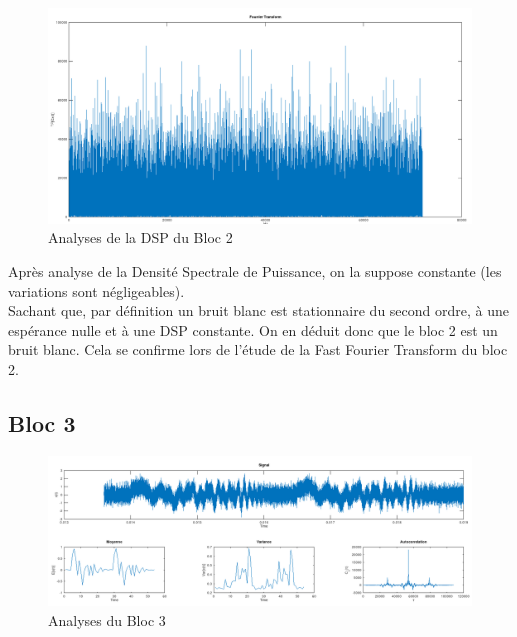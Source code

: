 \documentclass[french, a4paper, 12pt, openany]{book}
\begin{document}
	\begin{figure}[ht]
		\begin{center}
		\includegraphics[scale=0.25]{images/DSPBloc2.png}
		\end{center}
		\caption{Analyses de la DSP du Bloc 2}
		\label{Analyses de la DSP du Bloc 2}
	\end{figure}

	Après analyse de la Densité Spectrale de Puissance, on la suppose constante (les variations sont négligeables). \\
	Sachant que, par définition un bruit blanc est stationnaire du second ordre, à une espérance nulle et à une DSP constante. On en déduit donc que le bloc 2 est un bruit blanc. Cela se confirme lors de l'étude de la Fast Fourier Transform du bloc 2.

  \subsection{Bloc 3}

	\begin{figure}[ht]
		\begin{center}
		\includegraphics[scale=0.25]{images/SignalBloc3.png}
		\end{center}
		\caption{Analyses du Bloc 3}
		\label{Analyses du Bloc 3}
	\end{figure}
\end{document}
